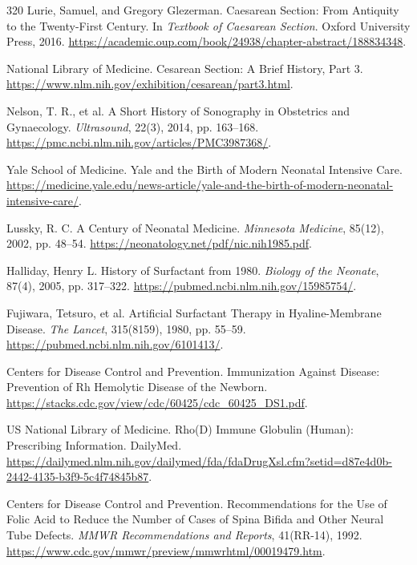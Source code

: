 \documentclass[12pt,oneside]{book}
\begin{document}
\begin{thebibliography}{320}
Lurie, Samuel, and Gregory Glezerman. Caesarean Section: From Antiquity to
the Twenty-First Century. In \emph{Textbook of Caesarean Section}. Oxford
University Press, 2016.
\url{https://academic.oup.com/book/24938/chapter-abstract/188834348}.

National Library of Medicine. Cesarean Section: A Brief History, Part 3.
\url{https://www.nlm.nih.gov/exhibition/cesarean/part3.html}.

Nelson, T. R., et al. A Short History of Sonography in Obstetrics and
Gynaecology. \emph{Ultrasound}, 22(3), 2014, pp. 163--168.
\url{https://pmc.ncbi.nlm.nih.gov/articles/PMC3987368/}.

Yale School of Medicine. Yale and the Birth of Modern Neonatal Intensive Care.
\url{https://medicine.yale.edu/news-article/yale-and-the-birth-of-modern-neonatal-intensive-care/}.

Lussky, R. C. A Century of Neonatal Medicine.
\emph{Minnesota Medicine}, 85(12), 2002, pp. 48--54.
\url{https://neonatology.net/pdf/nic.nih1985.pdf}.

Halliday, Henry L. History of Surfactant from 1980.
\emph{Biology of the Neonate}, 87(4), 2005, pp. 317--322.
\url{https://pubmed.ncbi.nlm.nih.gov/15985754/}.

Fujiwara, Tetsuro, et al. Artificial Surfactant Therapy in Hyaline-Membrane
Disease. \emph{The Lancet}, 315(8159), 1980, pp. 55--59.
\url{https://pubmed.ncbi.nlm.nih.gov/6101413/}.

Centers for Disease Control and Prevention. Immunization Against Disease:
Prevention of Rh Hemolytic Disease of the Newborn.
\url{https://stacks.cdc.gov/view/cdc/60425/cdc_60425_DS1.pdf}.

US National Library of Medicine. Rho(D) Immune Globulin (Human): Prescribing
Information. DailyMed.
\url{https://dailymed.nlm.nih.gov/dailymed/fda/fdaDrugXsl.cfm?setid=d87e4d0b-2442-4135-b3f9-5c4f74845b87}.

Centers for Disease Control and Prevention. Recommendations for the Use of
Folic Acid to Reduce the Number of Cases of Spina Bifida and Other Neural Tube
Defects. \emph{MMWR Recommendations and Reports}, 41(RR-14), 1992.
\url{https://www.cdc.gov/mmwr/preview/mmwrhtml/00019479.htm}.


\end{thebibliography}
\end{document}
